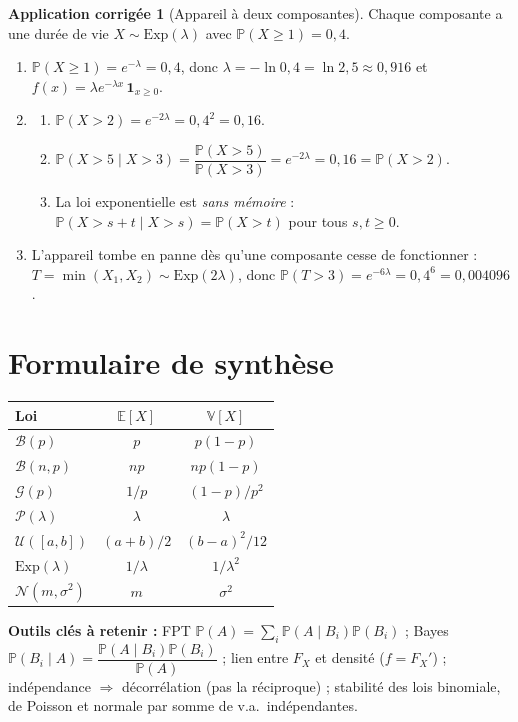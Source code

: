 \documentclass[11pt,a4paper]{article}
\newcommand{\E}{\mathbb{E}}
\newcommand{\V}{\mathbb{V}}
\renewcommand{\P}{\mathbb{P}}
\newcommand{\1}{\mathbf{1}}
\theoremstyle{definition}
\newtheorem*{application}{Application corrigée}
\theoremstyle{plain}
\theoremstyle{remark}
\begin{document}
\begin{application}[Appareil à deux composantes]
Chaque composante a une durée de vie $X\sim\mathrm{Exp}(\lambda)$ avec $\P(X\ge1)=0{,}4$.
\begin{enumerate}
  \item $\P(X\ge1)=e^{-\lambda}=0{,}4$, donc $\lambda=-\ln0{,}4=\ln2{,}5\approx0{,}916$ et $f(x)=\lambda e^{-\lambda x}\,\1_{x\ge0}$.
  \item
    \begin{enumerate}[label=\alph*)]
      \item $\P(X>2)=e^{-2\lambda}=0{,}4^2=0{,}16$.
      \item $\P(X>5\mid X>3)=\dfrac{\P(X>5)}{\P(X>3)}=e^{-2\lambda}=0{,}16=\P(X>2)$.
      \item La loi exponentielle est \emph{sans mémoire} : $\P(X>s+t\mid X>s)=\P(X>t)$ pour tous $s,t\ge0$.
    \end{enumerate}
  \item L'appareil tombe en panne dès qu'une composante cesse de fonctionner : $T=\min(X_1,X_2)\sim\mathrm{Exp}(2\lambda)$, donc $\P(T>3)=e^{-6\lambda}=0{,}4^6=0{,}004096$.
\end{enumerate}
\end{application}

\section{Formulaire de synthèse}

\begin{center}
\begin{tabular}{lcc}
\toprule
\textbf{Loi} & $\E[X]$ & $\V[X]$\\
\midrule
$\mathcal{B}(p)$ & $p$ & $p(1-p)$\\
$\mathcal{B}(n,p)$ & $np$ & $np(1-p)$\\
$\mathcal{G}(p)$ & $1/p$ & $(1-p)/p^2$\\
$\mathcal{P}(\lambda)$ & $\lambda$ & $\lambda$\\
$\mathcal{U}([a,b])$ & $(a+b)/2$ & $(b-a)^2/12$\\
$\mathrm{Exp}(\lambda)$ & $1/\lambda$ & $1/\lambda^2$\\
$\mathcal{N}(m,\sigma^2)$ & $m$ & $\sigma^2$\\
\bottomrule
\end{tabular}
\end{center}

\noindent\textbf{Outils clés à retenir :} FPT $\P(A)=\sum_i\P(A\mid B_i)\P(B_i)$ ; Bayes $\P(B_i\mid A)=\dfrac{\P(A\mid B_i)\P(B_i)}{\P(A)}$ ; lien entre $F_X$ et densité ($f=F_X'$) ; indépendance $\Rightarrow$ décorrélation (pas la réciproque) ; stabilité des lois binomiale, de Poisson et normale par somme de v.a.\ indépendantes.
\end{document}
